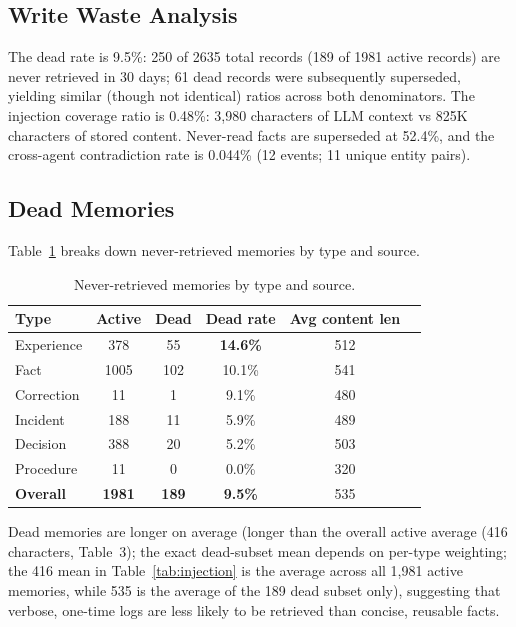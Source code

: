 \documentclass{llncs}
\begin{document}
\subsection{Write Waste Analysis}

The dead rate is 9.5\%: 250 of 2{}635 total records (189 of 1{}981 active records) are never retrieved in 30 days; 61 dead records were subsequently superseded, yielding similar (though not identical) ratios across both denominators. The injection coverage ratio is 0.48\%: 3,980 characters of LLM context vs 825K characters of stored content. Never-read facts are superseded at 52.4\%, and the cross-agent contradiction rate is 0.044\% (12 events; 11 unique entity pairs).

\subsection{Dead Memories}

Table~\ref{tab:dead} breaks down never-retrieved memories by type and source.

\begin{table}[h]
\centering
\caption{Never-retrieved memories by type and source.}
\label{tab:dead}
\begin{tabular}{lccccc}
\toprule
Type & Active & Dead & Dead rate & Avg content len \\
\midrule
Experience & 378 & 55 & \textbf{14.6\%} & 512 \\
Fact & 1005 & 102 & 10.1\% & 541 \\
Correction & 11 & 1 & 9.1\% & 480 \\
Incident & 188 & 11 & 5.9\% & 489 \\
Decision & 388 & 20 & 5.2\% & 503 \\
Procedure & 11 & 0 & 0.0\% & 320 \\
\midrule
\textbf{Overall} & \textbf{1981} & \textbf{189} & \textbf{9.5\%} & 535 \\
\bottomrule
\end{tabular}
\end{table}

Dead memories are longer on average (longer than the overall active average (416 characters, Table~3); the exact dead-subset mean depends on per-type weighting; the 416 mean in Table~\ref{tab:injection} is the average across all 1,981 active memories, while 535 is the average of the 189 dead subset only), suggesting that verbose, one-time logs are less likely to be retrieved than concise, reusable facts.
\end{document}

